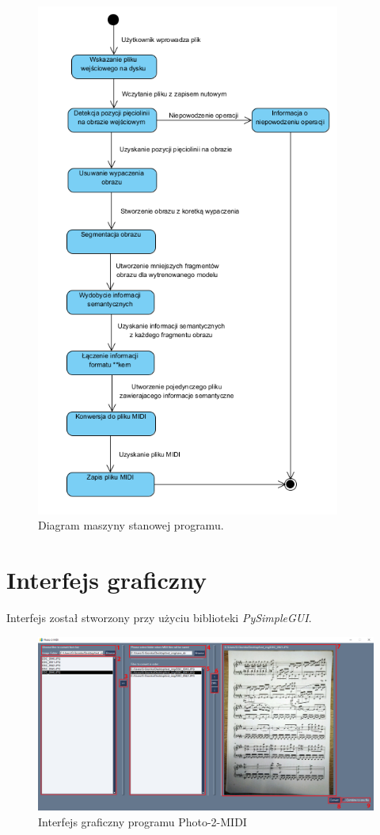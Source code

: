 \begin{figure}
	\centering
	\includegraphics[width=10cm]{images/diagram-maszyny-stanowej-programu.png}
	\caption{Diagram maszyny stanowej programu.}
	\label{fig:program-state-machine}
\end{figure}


\section{Interfejs graficzny}

Interfejs został stworzony przy użyciu biblioteki \textit{PySimpleGUI}.

\begin{figure}[h]
	\centering
	\includegraphics[width=16cm]{images/gui}
	\caption{Interfejs graficzny programu Photo-2-MIDI}
	\label{fig:gui}
\end{figure}

